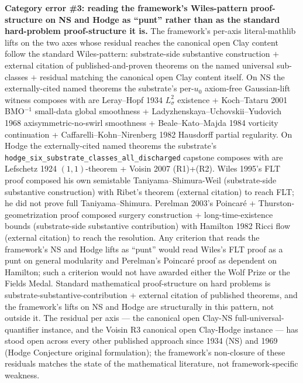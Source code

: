 \documentclass[11pt,a4paper]{amsart}
\theoremstyle{plain}
\theoremstyle{definition}
\begin{document}
\begin{framed}
\smallskip
\noindent\textbf{Category error \#3: reading the framework's Wiles-pattern proof-structure on NS and Hodge as ``punt'' rather than as the standard hard-problem proof-structure it is.} The framework's per-axis literal-mathlib lifts on the two axes whose residual reaches the canonical open Clay content follow the standard Wiles-pattern: substrate-side substantive construction $+$ external citation of published-and-proven theorems on the named universal sub-classes $+$ residual matching the canonical open Clay content itself. On NS the externally-cited named theorems the substrate's per-$u_0$ axiom-free Gaussian-lift witness composes with are Leray--Hopf 1934 $L^2_\sigma$ existence + Koch--Tataru 2001 BMO$^{-1}$ small-data global smoothness + Ladyzhenskaya--Uchovskii--Yudovich 1968 axisymmetric-no-swirl smoothness + Beale--Kato--Majda 1984 vorticity continuation + Caffarelli--Kohn--Nirenberg 1982 Hausdorff partial regularity. On Hodge the externally-cited named theorems the substrate's \texttt{hodge\_six\_substrate\_classes\_all\_discharged} capstone composes with are Lefschetz 1924 $(1,1)$-theorem + Voisin 2007 (R1)+(R2). Wiles 1995's FLT proof composed his own semistable Taniyama--Shimura-Weil (substrate-side substantive construction) with Ribet's theorem (external citation) to reach FLT; he did not prove full Taniyama--Shimura. Perelman 2003's Poincar\'e + Thurston-geometrization proof composed surgery construction + long-time-existence bounds (substrate-side substantive contribution) with Hamilton 1982 Ricci flow (external citation) to reach the resolution. Any criterion that reads the framework's NS and Hodge lifts as ``punt'' would read Wiles's FLT proof as a punt on general modularity and Perelman's Poincar\'e proof as dependent on Hamilton; such a criterion would not have awarded either the Wolf Prize or the Fields Medal. Standard mathematical proof-structure on hard problems is substrate-substantive-contribution + external citation of published theorems, and the framework's lifts on NS and Hodge are structurally in this pattern, not outside it. The residual per axis --- the canonical open Clay-NS full-universal-quantifier instance, and the Voisin R3 canonical open Clay-Hodge instance --- has stood open across every other published approach since 1934 (NS) and 1969 (Hodge Conjecture original formulation); the framework's non-closure of these residuals matches the state of the mathematical literature, not framework-specific weakness.
\end{framed}

\tableofcontents
\end{document}
